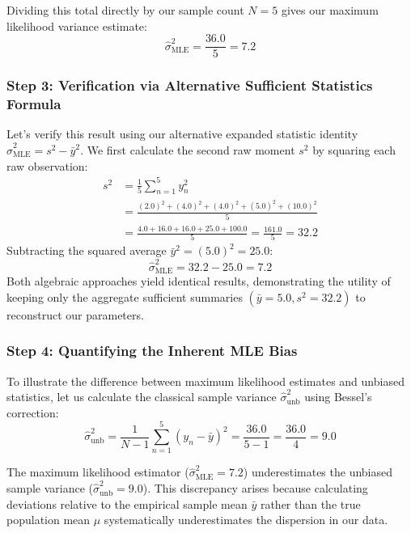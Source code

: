 \documentclass{article}
\begin{document}
Dividing this total directly by our sample count $N = 5$ gives our maximum likelihood variance estimate:
\begin{equation}
\hat{\sigma}^2_{\text{MLE}} = \frac{36.0}{5} = \mathbf{7.2}
\end{equation}

\subsubsection{Step 3: Verification via Alternative Sufficient Statistics Formula}
Let's verify this result using our alternative expanded statistic identity $\hat{\sigma}^2_{\text{MLE}} = s^2 - \bar{y}^2$. We first calculate the second raw moment $s^2$ by squaring each raw observation:
\begin{align*}
s^2 &= \frac{1}{5} \sum_{n=1}^{5} y_n^2 \\
&= \frac{(2.0)^2 + (4.0)^2 + (4.0)^2 + (5.0)^2 + (10.0)^2}{5} \\
&= \frac{4.0 + 16.0 + 16.0 + 25.0 + 100.0}{5} = \frac{161.0}{5} = \mathbf{32.2}
\end{align*}
Subtracting the squared average $\bar{y}^2 = (5.0)^2 = 25.0$:
\begin{equation}
\hat{\sigma}^2_{\text{MLE}} = 32.2 - 25.0 = \mathbf{7.2}
\end{equation}
Both algebraic approaches yield identical results, demonstrating the utility of keeping only the aggregate sufficient summaries $(\bar{y} = 5.0, s^2 = 32.2)$ to reconstruct our parameters.

\subsubsection{Step 4: Quantifying the Inherent MLE Bias}
To illustrate the difference between maximum likelihood estimates and unbiased statistics, let us calculate the classical sample variance $\hat{\sigma}^2_{\text{unb}}$ using Bessel's correction:
\begin{equation}
\hat{\sigma}^2_{\text{unb}} = \frac{1}{N - 1} \sum_{n=1}^{5} (y_n - \bar{y})^2 = \frac{36.0}{5 - 1} = \frac{36.0}{4} = \mathbf{9.0}
\end{equation}

The maximum likelihood estimator ($\hat{\sigma}^2_{\text{MLE}} = 7.2$) underestimates the unbiased sample variance ($\hat{\sigma}^2_{\text{unb}} = 9.0$). This discrepancy arises because calculating deviations relative to the empirical sample mean $\bar{y}$ rather than the true population mean $\mu$ systematically underestimates the dispersion in our data. 
\end{document}
